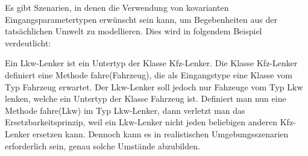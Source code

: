 \documentclass[a4paper,10pt]{article}
\begin{document}
Es gibt Szenarien, in denen die Verwendung von kovarianten Eingangsparametertypen erwünscht sein kann, um Begebenheiten aus der tatsächlichen Umwelt zu modellieren. Dies wird in folgendem Beispiel verdeutlicht:

Ein Lkw-Lenker ist ein Untertyp der Klasse Kfz-Lenker. Die Klasse Kfz-Lenker definiert eine Methode fahre(Fahrzeug), die als Eingangstype eine Klasse vom Typ Fahrzeug erwartet. Der Lkw-Lenker soll jedoch nur Fahzeuge vom Typ Lkw lenken, welche ein Untertyp der Klasse Fahrzeug ist. Definiert man nun eine Methode fahre(Lkw) im Typ Lkw-Lenker, dann verletzt man das Ersetzbarkeitsprinzip, weil ein Lkw-Lenker nicht jeden beliebigen anderen Kfz-Lenker ersetzen kann. Dennoch kann es in realistischen Umgebungsszenarien erforderlich sein, genau solche Umstände abzubilden.





\begin{comment}
Von OOP: Mehrfach dynamisches Binden, Multimethoden.
\end{comment}
\end{document}
